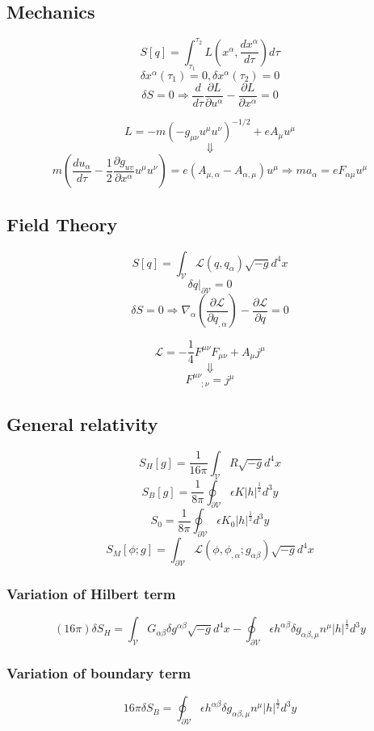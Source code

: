 \subsection{Mechanics}
\[S[q] = \int_{\tau_1}^{\tau_2} L(x^{\alpha},\frac{dx^{\alpha}}{d\tau}) d\tau\]
\[\delta x^{\alpha}(\tau_1)=0, \delta x^{\alpha}(\tau_2)=0\]
\[\delta S = 0 \Rightarrow \frac{d}{d\tau} \frac{\partial L}{\partial u^{\alpha}} - \frac{\partial L}{\partial x^{\alpha}}=0\]
\begin{example}
\[L = -m(-g_{\mu\nu} u^{\mu} u^{\nu})^{-1/2} + e A_{\mu} u^{\mu}\]
\[\Downarrow\]
\[m(\frac{du_{\alpha}}{d\tau} - \frac{1}{2} \frac{\partial g_{uv}}{\partial x^{\alpha}} u^{\mu} u^{\nu}) = e(A_{\mu,\alpha}-A_{\alpha,\mu})u^{\mu} \Rightarrow ma_{\alpha} = eF_{\alpha\mu} u^{\mu} \]
\end{example}

\subsection{Field Theory}
\[S[q] = \int_{\mathcal{V}} \mathcal{L}(q,q_{\alpha})\sqrt{-g} d^4x\]
\[\delta q|_{\partial \mathcal{V}} = 0\]
\[\delta S = 0 \Rightarrow \nabla_{\alpha} (\frac{\partial \mathcal{L}}{\partial q_{,\alpha}}) - \frac{\partial \mathcal{L}}{\partial q} = 0\]
\begin{example}
\[\mathcal{L} = -\frac{1}{4} F^{\mu \nu} F_{\mu \nu} + A_{\mu} j^{\mu}\]
\[\Downarrow\]
\[F^{\mu \nu}_{\phantom{\mu \nu} ;\nu} = j^{\mu}\]
\end{example}

\subsection{General relativity}
\[S_{H}[g] = \frac{1}{16\pi} \int_{\mathcal{V}} R \sqrt{-g} d^4 x\]
\[S_{B}[g] = \frac{1}{8 \pi} \oint_{\partial \mathcal{V}} \epsilon K |h|^{\frac{1}{2}} d^3 y\]
\[S_0 = \frac{1}{8\pi} \oint_{\partial \mathcal{V}} \epsilon K_0 |h|^{\frac{1}{2}} d^3 y\]
\[S_M[\phi;g] = \int_{\partial \mathcal{V}} \mathcal{L}(\phi,\phi_{,\alpha};g_{\alpha \beta}) \sqrt{-g} d^4 x\]
\subsubsection{Variation of Hilbert term}
\[(16 \pi) \delta S_H = \int_{\mathcal{V}} G_{\alpha \beta} \delta g^{\alpha \beta} \sqrt{-g} d^4 x - \oint_{\partial \mathcal{V}} \epsilon h^{\alpha \beta} \delta g_{\alpha \beta, \mu} n^{\mu} |h|^{\frac{1}{2}} d^3 y\]
\subsubsection{Variation of boundary term}
\[16\pi \delta S_B = \oint_{\partial \mathcal{V}} \epsilon h^{\alpha \beta} \delta g_{\alpha \beta, \mu} n^{\mu} |h|^{\frac{1}{2}} d^3 y \]
